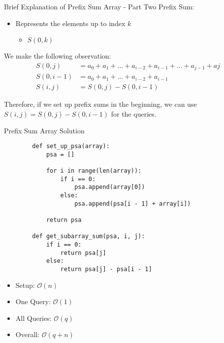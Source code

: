 \documentclass{beamer}
\begin{document}
\begin{frame}{Brief Explanation of Prefix Sum Array - Part Two}
Prefix Sum:
\begin{itemize}
    \item Represents the elements up to index $k$
    \begin{itemize}
        \item $S(0, k)$
    \end{itemize}
\end{itemize} 

We make the following observation:
\begin{align*}
    S(0, j) &= a_0 + a_1 + \dots + a_{i - 2} + a_{i - 1} + \dots + a_{j - 1} + a{j} \\
    S(0, i - 1) &= a_0 + a_1 + \dots + a_{i - 2} + a_{i - 1} \\
    S(i, j) &= S(0, j) - S(0, i - 1)
\end{align*}

Therefore, if we set up prefix sums in the beginning, we can use $S(i, j)=S(0, j) - S(0, i - 1)$ for the queries.

\end{frame}

\begin{frame}[fragile]{Prefix Sum Array Solution}
    \begin{lstlisting}
        def set_up_psa(array):
            psa = []
            
            for i in range(len(array)):
                if i == 0:
                    psa.append(array[0])
                else:
                    psa.append(psa[i - 1] + array[i])
        
            return psa
        
        def get_subarray_sum(psa, i, j):
            if i == 0:
                return psa[j]
            else:
                return psa[j] - psa[i - 1]
    \end{lstlisting}
    
    \begin{itemize}
        \item Setup: $\mathcal{O}(n)$
        \item One Query: $\mathcal{O}(1)$
        \item All Queries: $\mathcal{O}(q)$
        \item Overall: $\mathcal{O}(q + n)$
    \end{itemize}
\end{frame}
\end{document}
